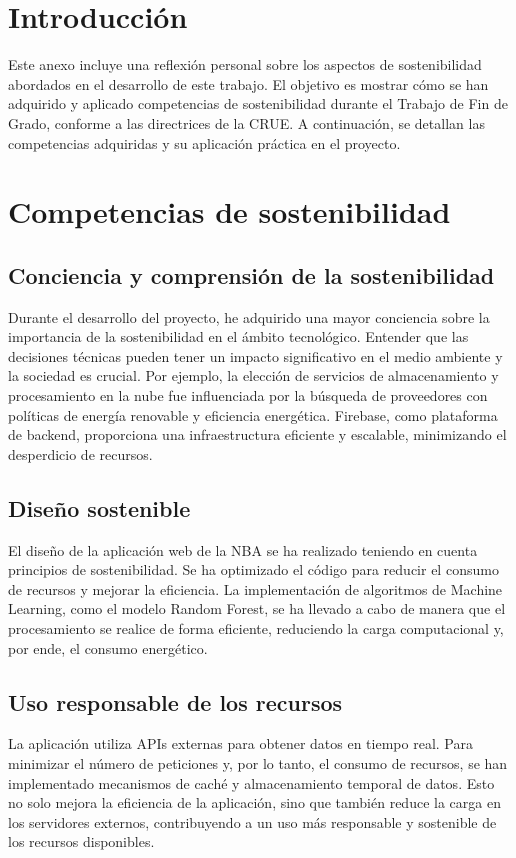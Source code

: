 
\section{Introducción}
Este anexo incluye una reflexión personal sobre los aspectos de sostenibilidad abordados en el desarrollo de este trabajo. El objetivo es mostrar cómo se han adquirido y aplicado competencias de sostenibilidad durante el Trabajo de Fin de Grado, conforme a las directrices de la CRUE. A continuación, se detallan las competencias adquiridas y su aplicación práctica en el proyecto.

\section{Competencias de sostenibilidad}

\subsection{Conciencia y comprensión de la sostenibilidad}
Durante el desarrollo del proyecto, he adquirido una mayor conciencia sobre la importancia de la sostenibilidad en el ámbito tecnológico. Entender que las decisiones técnicas pueden tener un impacto significativo en el medio ambiente y la sociedad es crucial. Por ejemplo, la elección de servicios de almacenamiento y procesamiento en la nube fue influenciada por la búsqueda de proveedores con políticas de energía renovable y eficiencia energética. Firebase, como plataforma de backend, proporciona una infraestructura eficiente y escalable, minimizando el desperdicio de recursos.

\subsection{Diseño sostenible}
El diseño de la aplicación web de la NBA se ha realizado teniendo en cuenta principios de sostenibilidad. Se ha optimizado el código para reducir el consumo de recursos y mejorar la eficiencia. La implementación de algoritmos de Machine Learning, como el modelo Random Forest, se ha llevado a cabo de manera que el procesamiento se realice de forma eficiente, reduciendo la carga computacional y, por ende, el consumo energético.

\subsection{Uso responsable de los recursos}
La aplicación utiliza APIs externas para obtener datos en tiempo real. Para minimizar el número de peticiones y, por lo tanto, el consumo de recursos, se han implementado mecanismos de caché y almacenamiento temporal de datos. Esto no solo mejora la eficiencia de la aplicación, sino que también reduce la carga en los servidores externos, contribuyendo a un uso más responsable y sostenible de los recursos disponibles.

